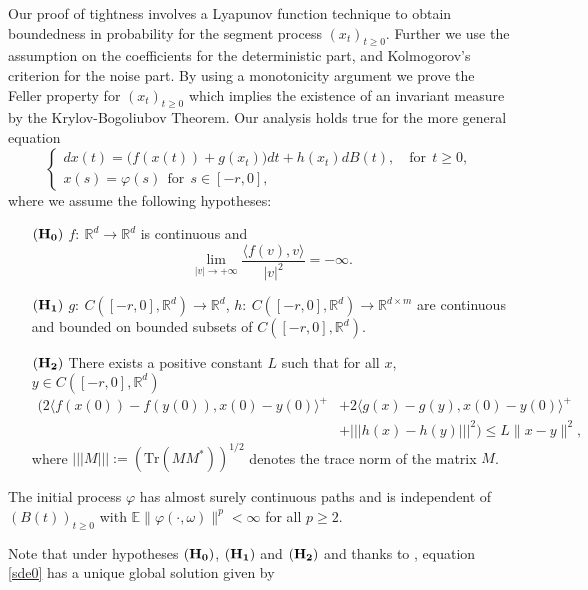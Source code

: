 \documentclass[11pt,reqno,draft]{amsart}
\begin{document}
\noindent Our proof of tightness involves a Lyapunov function
technique to obtain boundedness in probability for the segment
process $(x_t)_{t\geq 0}$. Further we use the assumption on the
coefficients for the deterministic part, and Kolmogorov's criterion
for the noise part. By using a monotonicity argument we prove the
Feller property for $(x_t)_{t\geq 0}$ which implies the existence of
an invariant measure by the Krylov-Bogoliubov Theorem. Our analysis
holds true for the more general equation
\begin{equation}\label{sde0}
 \left\{
\begin{array}{ll}
dx(t)=\Big(f(x(t))+g(x_t)\Big)dt+h(x_t)dB(t),\quad\mbox{for}\:\:
t\geq0,\\
x(s)=\varphi(s)\:\:\mbox{for}\:\: s\in[-r,0],
\end{array}
\right.
\end{equation}
where we assume the following hypotheses:
\begin{enumerate}

\item [${\bf (H_0)}$] $f:\:{\mathbb R}^d\rightarrow{\mathbb R}^d$ is continuous and
$$
\lim\limits_{|v|\to +\infty} \frac{{\langle} f(v),v{\rangle}}{|v|^2}=-\infty.
$$
\item [${\bf (H_1)}$]  $g:\:C([-r,0],\mathbb{R}^d)\rightarrow{\mathbb R}^d$,  $h:\:C([-r,0],\mathbb{R}^d)\rightarrow{\mathbb R}^{d\times m}$
are continuous and bounded on bounded subsets of $C([-r,0],{\mathbb R}^d)$.

\item [${\bf (H_2)}$] There exists a positive constant
$L$ such that for all $x$, $y\in C([-r,0],\mathbb{R}^d) $
\begin{equation*}
\begin{split}
\Big(2{\langle} f(x(0))-f(y(0)),x(0)-y(0){\rangle}^{+}&+2{\langle}
g(x)-g(y),x(0)-y(0){\rangle}^{+}\\&+{|\!|\!|{ h(x)-h(y)}|\!|\!|}^2\Big)\leq L \|x-y\|^2,
\end{split}
\end{equation*}
where ${|\!|\!|M|\!|\!|} :=(\mathrm{Tr} (M M^*))^{1/2}$ denotes the trace norm of the matrix $M$.
\end{enumerate}
\noindent  The initial process $\varphi$ has almost surely
continuous paths and is independent of $(B(t))_{t\geq 0}$ with
${\mathbb E}\|\varphi(\cdot,\omega)\|^p<\infty$ for all $p\geq 2$.

\noindent Note that under hypotheses ${\bf (H_0)} $, ${\bf (H_1)}$
and ${\bf (H_2)} $ and thanks to \cite[Theorem 2.3]{RS}, equation
\eqref{sde0} has a unique global solution given by
\end{document}
